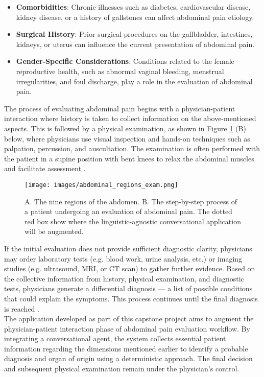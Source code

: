 \begin{itemize}
    \item \textcolor{TUMRed}{\textbf{Comorbidities}}: Chronic illnesses such as diabetes, cardiovascular disease, kidney disease, or a history of gallstones can affect abdominal pain etiology.
    \item \textcolor{TUMRed}{\textbf{Surgical History}}: Prior surgical procedures on the gallbladder, intestines, kidneys, or uterus can influence the current presentation of abdominal pain.
    \item \textcolor{TUMRed}{\textbf{Gender-Specific Considerations}}: Conditions related to the female reproductive health, such as abnormal vaginal bleeding, menstrual irregularities, and foul discharge, play a role in the evaluation of abdominal pain.
\end{itemize}
\noindent The process of evaluating abdominal pain begins with a physician-patient interaction where history is taken to collect information on the above-mentioned aspects. This is followed by a physical examination, as shown in Figure \ref{fig:abdominal_regions} (B) below, where physicians use visual inspection and hands-on techniques such as palpation, percussion, and auscultation. The examination is often performed with the patient in a supine position with bent knees to relax the abdominal muscles and facilitate assessment \cite{AbExm, cartwright2008evaluation}.
\begin{figure}[H]
    \centering
    \texttt{[image: images/abdominal\_regions\_exam.png]}
    \caption{A. The nine regions of the abdomen. B. The step-by-step process of a patient undergoing an evaluation of abdominal pain. The dotted red box show where the linguistic-agnostic conversational application will be augmented.} 
    \label{fig:abdominal_regions}
\end{figure}

\noindent If the initial evaluation does not provide sufficient diagnostic clarity, physicians may order laboratory tests (e.g. blood work, urine analysis, etc.) or imaging studies (e.g. ultrasound, MRI, or CT scan) to gather further evidence. Based on the collective information from history, physical examination, and diagnostic tests, physicians generate a differential diagnosis --- a list of possible conditions that could explain the symptoms. This process continues until the final diagnosis is reached \cite{ddCleveland}.\\[\baselineskip]

\noindent The application developed as part of this capstone project aims to augment the physician-patient interaction phase of abdominal pain evaluation workflow. By integrating a conversational agent, the system collects essential patient information regarding the dimensions mentioned earlier to identify a probable diagnosis and organ of origin using a deterministic approach. The final decision and subsequent physical examination remain under the physician's control.

